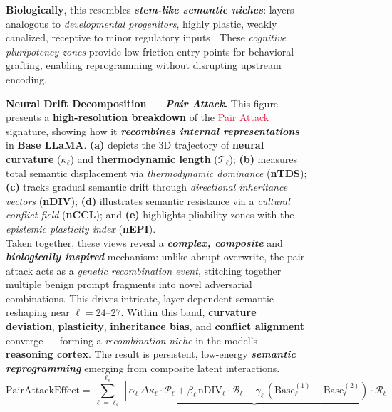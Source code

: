 \begin{figure}[htp!]
\begin{minipage}[t]{0.48\textwidth}
    \textbf{Biologically}, this resembles \textbf{\textit{stem-like semantic niches}}: layers analogous to \emph{developmental progenitors}, highly plastic, weakly canalized, receptive to minor regulatory inputs \citep{zhang2021epigenetic, frantz2015cell}. These \emph{cognitive pluripotency zones} provide low-friction entry points for behavioral grafting, enabling reprogramming without disrupting upstream encoding.
  \end{minipage}

  
\caption{\textbf{Neural Drift Decomposition — \textit{Pair Attack}.}  
This figure presents a \textbf{high-resolution breakdown} of the \textcolor{crimson}{Pair Attack} signature, showing how it \textbf{\emph{recombines internal representations}} in \textbf{Base LLaMA}.  
\textbf{(a)} depicts the 3D trajectory of \textbf{neural curvature} (\(\kappa_\ell\)) and \textbf{thermodynamic length} (\(\mathcal{T}_\ell\));  
\textbf{(b)} measures total semantic displacement via \emph{thermodynamic dominance} (\textbf{nTDS});  
\textbf{(c)} tracks gradual semantic drift through \emph{directional inheritance vectors} (\textbf{nDIV}); 
\textbf{(d)} illustrates semantic resistance via a \emph{cultural conflict field} (\textbf{nCCL}); and  
\textbf{(e)} highlights pliability zones with the \emph{epistemic plasticity index} (\textbf{nEPI}).
\\
Taken together, these views reveal a \textbf{\emph{complex, composite}} and \textbf{\emph{biologically inspired}} mechanism: unlike abrupt overwrite, the pair attack acts as a \emph{genetic recombination event}, stitching together multiple benign prompt fragments into novel adversarial combinations. This drives intricate, layer-dependent semantic reshaping near \(\ell = 24\text{–}27\). Within this band, \textbf{curvature deviation}, \textbf{plasticity}, \textbf{inheritance bias}, and \textbf{conflict alignment} converge — forming a \emph{recombination niche} in the model’s \textbf{reasoning cortex}. The result is persistent, low-energy \textbf{\textit{semantic reprogramming}} emerging from composite latent interactions.
\\
\[
\boxed{
\text{PairAttackEffect} = 
\sum_{\ell = \ell_s}^{\ell_e}
\underbrace{
  \left[
    \alpha_\ell \, \Delta \kappa_\ell \cdot \mathcal{P}_\ell +
    \beta_\ell \, \text{nDIV}_\ell \cdot \mathcal{B}_\ell +
    \gamma_\ell \, (\text{Base}_\ell^{(1)} - \text{Base}_\ell^{(2)}) \cdot \mathcal{R}_\ell
}}\]}
\end{figure}
